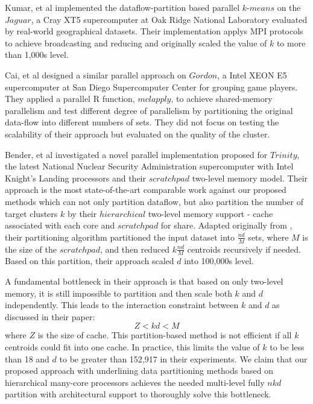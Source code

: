 Kumar, et al \cite{kumar2011parallel} implemented the dataflow-partition based parallel $k$-$means$ on the $Jaguar$, a Cray XT5 supercomputer
at Oak Ridge National Laboratory evaluated by real-world geographical datasets. Their implementation applys MPI protocols to achieve broadcasting and reducing and originally scaled the value of $k$ to more than 1,000s level.  

Cai, et al \cite{cai2015grouping} designed a similar parallel approach on $Gordon$, a Intel XEON E5 supercomputer at San Diego Supercomputer Center for grouping game players. They applied a parallel R function, $mclapply$, to achieve shared-memory parallelism and test different degree of parallelism by partitioning the original data-flow into different numbers of sets. They did not focus on testing the scalability of their approach but evaluated on the quality of the cluster. 

Bender, et al \cite{bender2015k} investigated a novel parallel implementation proposed for $Trinity$, the latest National Nuclear Security Administration supercomputer with Intel Knight's Landing processors and their $scratchpad$ two-level memory model. Their approach is the most state-of-the-art comparable work against our proposed methods which can not only partition dataflow, but also partition the number of target clusters $k$ by their $hierarchical$ two-level memory support - cache associated with each core and $scratchpad$ for share. Adapted originally from \cite{guha2003clustering}, their partitioning algorithm partitioned the input dataset into $\frac{nd}{M}$ sets, where $M$ is the size of the $scratchpad$, and then reduced $k\frac{nd}{M}$ centroids recursively if needed. Based on this partition, their approach scaled $d$ into 100,000s level.

A fundamental bottleneck in their approach is that  based on only two-level memory, it is still impossible to partition and then scale both $k$ and $d$ independently. This leads to the interaction constraint between $k$ and $d$ as discussed in their paper: 
$$ Z < kd < M$$
where $Z$ is the size of cache. This partition-based method is not efficient if all $k$ centroids could fit into one cache. In practice, this limits the value of $k$ to be less than 18 and $d$ to be greater than 152,917 in their experiments. We claim that our proposed approach with underlining data partitioning methods based on hierarchical many-core processors achieves the needed multi-level fully $nkd$ partition with architectural support to thoroughly solve this bottleneck. 

